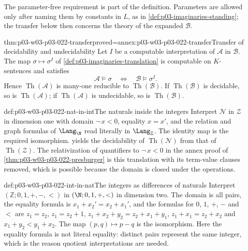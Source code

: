 The parameter-free requirement is part of the definition. Parameters are
allowed only after naming them by constants in \(L\), as in
\cref{def:p03-imaginaries-standing}; the transfer below then concerns the
theory of the expanded \(\mathcal B\).

\begin{hbtheorem}{thm:p03-w03-p03-022-transfer}{proved=annex:p03-w03-p03-022-transfer}{Transfer of decidability and undecidability}
Let \(I\) be a computable interpretation of \(\mathcal A\) in \(\mathcal B\).
The map \(\sigma\mapsto\sigma^I\) of \cref{def:p03-imaginaries-translation}
is computable on \(K\)-sentences and satisfies
\[
  \mathcal A\models\sigma\quad\Longleftrightarrow\quad
  \mathcal B\models\sigma^I .
\]
Hence \(\operatorname{Th}(\mathcal A)\) is many-one reducible to
\(\operatorname{Th}(\mathcal B)\). If \(\operatorname{Th}(\mathcal B)\) is decidable,
so is \(\operatorname{Th}(\mathcal A)\); if \(\operatorname{Th}(\mathcal A)\) is
undecidable, so is \(\operatorname{Th}(\mathcal B)\).
\end{hbtheorem}

\begin{hbexample}{def:p03-w03-p03-022-nat-in-int}{The naturals inside the integers}
Interpret \(\mathcal N\) in \(\mathcal Z\) in dimension one with domain
\(\neg\,x<0\), equality \(x=x'\), and the relation and graph formulas of
\(\Lang_{\N}\) read literally in \(\Lang_{\mathbb Z}\). The identity map is
the required isomorphism.  yields the
decidability of \(\operatorname{Th}(\mathcal N)\) from that of
\(\operatorname{Th}(\mathcal Z)\). The relativization of quantifiers to
\(\neg\,x<0\) in the annex proof of \cref{thm:p03-w03-p03-022-presburger}
is this translation with its term-value clauses removed, which is possible
because the domain is closed under the operations.
\end{hbexample}

\begin{hbexample}{def:p03-w03-p03-022-int-in-nat}{The integers as differences of naturals}
Interpret \((\mathbb Z;0,1,+,-,<)\) in \((\N;0,1,+,<)\) in dimension two.
The domain is all pairs, the equality formula is
\(x_1+x_2'=x_2+x_1'\), and the formulas for \(0\), \(1\), \(+\), \(-\)
and \(<\) are \(z_1=z_2\), \(z_1=z_2+1\),
\(z_1+x_2+y_2=z_2+x_1+y_1\), \(z_1+x_1=z_2+x_2\) and
\(x_1+y_2<y_1+x_2\). The map \((p,q)\mapsto p-q\) is the isomorphism. Here
the equality formula is not literal equality: distinct pairs represent the
same integer, which is the reason quotient interpretations are needed.
\end{hbexample}

